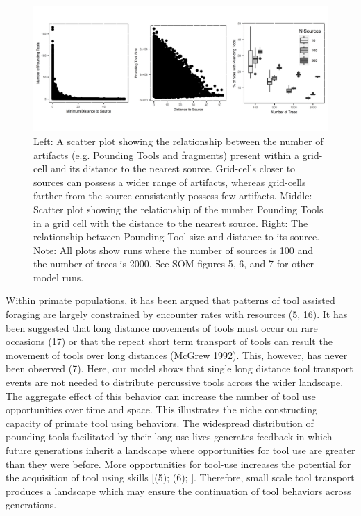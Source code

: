 \documentclass[9pt,twocolumn,twoside,]{pnas-new}
\begin{document}
\begin{figure}

\includegraphics[width=6.5in]{Reeves_et_al_2021_Panda_ABM_files/figure-latex/figure 4-1.png}

\caption{Left: A scatter plot showing the relationship between the number of artifacts (e.g. Pounding Tools and fragments) present within a grid-cell and its distance to the nearest source. Grid-cells closer to sources can possess a wider range of artifacts, whereas grid-cells farther from the source consistently possess few artifacts. Middle: Scatter plot showing the relationship of the number Pounding Tools in a grid cell with the distance to the nearest source. Right: The relationship between Pounding Tool size and distance to its source. Note: All plots show runs where the number of sources is 100 and the number of trees is 2000. See SOM figures 5, 6, and 7 for other model runs.}

\label{assemblages}

\end{figure}

Within primate populations, it has been argued that patterns of tool
assisted foraging are largely constrained by encounter rates with
resources (5, 16). It has been suggested that long distance movements of
tools must occur on rare occasions (17) or that the repeat short term
transport of tools can result the movement of tools over long distances
(McGrew 1992). This, however, has never been observed (7). Here, our
model shows that single long distance tool transport events are not
needed to distribute percussive tools across the wider landscape. The
aggregate effect of this behavior can increase the number of tool use
opportunities over time and space. This illustrates the niche
constructing capacity of primate tool using behaviors. The widespread
distribution of pounding tools facilitated by their long use-lives
generates feedback in which future generations inherit a landscape where
opportunities for tool use are greater than they were before. More
opportunities for tool-use increases the potential for the acquisition
of tool using skills {[}(5); (6); {]}. Therefore, small scale tool
transport produces a landscape which may ensure the continuation of tool
behaviors across generations.
\end{document}
